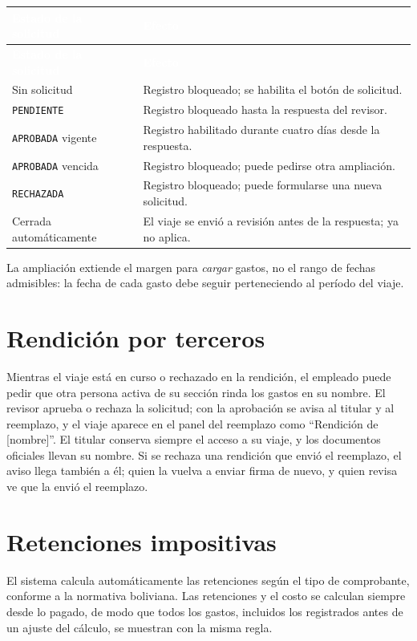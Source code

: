 \documentclass[11pt,letterpaper]{article}
\newcommand{\cabecera}{\rowcolor{maxamPrimario}}
\newcommand{\tth}[1]{\textcolor{white}{\textbf{#1}}}
\newcommand{\code}[1]{\nolinkurl{#1}}
\begin{document}
\begin{xltabular}{\textwidth}{L{4.6cm} Y}
\cabecera \tth{Estado de la solicitud} & \tth{Efecto} \\
\endfirsthead
\cabecera \tth{Estado de la solicitud} & \tth{Efecto} \\
\endhead
{} Sin solicitud & Registro bloqueado; se habilita el botón de solicitud. \\
\code{PENDIENTE} & Registro bloqueado hasta la respuesta del revisor. \\
 \code{APROBADA} vigente & Registro habilitado durante cuatro días desde la respuesta. \\
\code{APROBADA} vencida & Registro bloqueado; puede pedirse otra ampliación. \\
 \code{RECHAZADA} & Registro bloqueado; puede formularse una nueva solicitud. \\
Cerrada automáticamente & El viaje se envió a revisión antes de la respuesta; ya no aplica. \\
\end{xltabular}

La ampliación extiende el margen para \textit{cargar} gastos, no el rango de fechas admisibles: la fecha de cada gasto debe seguir perteneciendo al período del viaje.

\section{Rendición por terceros}
Mientras el viaje está en curso o rechazado en la rendición, el empleado puede pedir que otra persona activa de su sección rinda los gastos en su nombre. El revisor aprueba o rechaza la solicitud; con la aprobación se avisa al titular y al reemplazo, y el viaje aparece en el panel del reemplazo como ``Rendición de [nombre]''. El titular conserva siempre el acceso a su viaje, y los documentos oficiales llevan su nombre. Si se rechaza una rendición que envió el reemplazo, el aviso llega también a él; quien la vuelva a enviar firma de nuevo, y quien revisa ve que la envió el reemplazo.

\section{Retenciones impositivas}
El sistema calcula automáticamente las retenciones según el tipo de comprobante, conforme a la normativa boliviana. Las retenciones y el costo se calculan siempre desde lo pagado, de modo que todos los gastos, incluidos los registrados antes de un ajuste del cálculo, se muestran con la misma regla.
\end{document}

